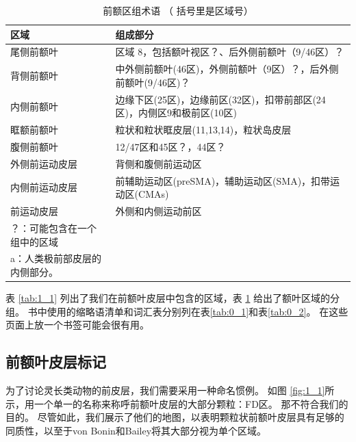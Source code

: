 \begin{table}[htbp] 
	\newcommand{\tabincell}[2]{\begin{tabular}{@{}#1@{}}#2\end{tabular}} %
	\centering
	\caption{前额区组术语 （ 括号里是区域号）\label{tab:1_2}}
	\renewcommand\arraystretch{1.5}	%
	\begin{tabular}{ll}
		\toprule
		区域 & 组成部分 \\
		\midrule
		尾侧前额叶 & 区域 8，包括额叶视区？、后外侧前额叶（9/46区）？  \\
		背侧前额叶 & 中外侧前额叶(46区)，外侧前额叶（9区）？，后外侧前额叶(9/46区)？ \\
		内侧前额叶&边缘下区(25区)，边缘前区(32区)，扣带前部区(24区)，内侧区9和极前区(10区)  \\
		眶额前额叶 & 粒状和粒状眶皮层(11,13,14)，粒状岛皮层  \\
		腹侧前额叶&12/47区和45区？，44区？ \\
		外侧前运动皮层 & 背侧和腹侧前运动区\\
		内侧前运动皮层 & 前辅助运动区(preSMA)，辅助运动区(SMA)，扣带运动区(CMAs)  \\
		前运动皮层 & 外侧和内侧运动前区  \\
		\bottomrule
	\par？：可能包含在一个组中的区域\\
		\par a：人类极前部皮层的内侧部分。
	\end{tabular}%
\end{table}%


\par
表 \ref{tab:1_1} 列出了我们在前额叶皮层中包含的区域，表 \ref{tab:1_2} 给出了额叶区域的分组。
书中使用的缩略语清单和词汇表分别列在表\ref{tab:0_1}和表\ref{tab:0_2}。
在这些页面上放一个书签可能会很有用。


\subsection{前额叶皮层标记}
为了讨论灵长类动物的前皮层，我们需要采用一种命名惯例。
如图 \ref{fig:1_1}所示，用一个单一的名称来称呼前额叶皮层的大部分颗粒：FD区\cite{von1947neocortex}。
那不符合我们的目的。
尽管如此，我们展示了他们的地图，以表明颗粒状前额叶皮层具有足够的同质性，以至于von Bonin和Bailey将其大部分视为单个区域。

